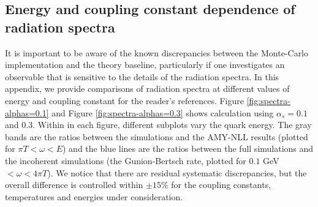 \documentclass[aps, prc, reprint, amsmath, groupedaddress, nofootinbib]{revtex4-1}
\begin{document}
\begin{appendices}
\section{Energy and coupling constant dependence of radiation spectra}\label{app:tune-spectrum}
It is important to be aware of the known discrepancies between the Monte-Carlo implementation and the theory baseline, particularly if one investigates an observable that is sensitive to the details of the radiation spectra. 
In this appendix, we provide comparisons of radiation spectra at different values of energy and coupling constant for the reader's references.
Figure \ref{fig:spectra-alphas=0.1} and Figure \ref{fig:spectra-alphas=0.3} shows calculation using $\alpha_s = 0.1$ and $0.3$.
Within in each figure, different subplots vary the quark energy.
The gray bands are the ratios between the simulations and the AMY-NLL results (plotted for $\pi T < \omega < E$) and the blue lines are the ratios between the full simulations and the incoherent simulations (the Gunion-Bertsch rate, plotted for $0.1$ GeV $< \omega < 4\pi T $).
We notice that there are residual systematic discrepancies, but the overall difference is controlled within $\pm 15\%$ for the coupling constants, temperatures and energies under consideration.

\end{appendices}
 
\end{document}
